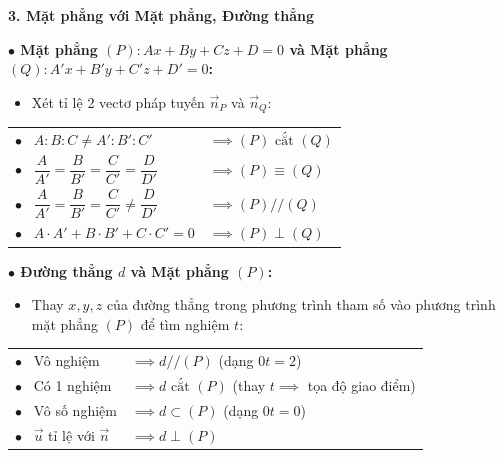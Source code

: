 \documentclass[12pt,a4paper]{article}
\begin{document}
\begin{theorybox}
    \textbf{\textcolor{deepblue}{\large 3. Mặt phẳng với Mặt phẳng, Đường thẳng}}
    \par\vspace{6pt}

    \textbf{\textcolor{amberorange}{$\bullet$ Mặt phẳng $(P)\colon Ax+By+Cz+D=0$ và Mặt phẳng $(Q)\colon A'x+B'y+C'z+D'=0$:}}
    \begin{itemize}
        \item Xét tỉ lệ 2 vectơ pháp tuyến $\vec{n}_P$ và $\vec{n}_Q$:
    \end{itemize}
    \renewcommand{\arraystretch}{1.45}
    \begin{center}
    \begin{tabular}{l @{\hskip 25pt} l}
        $\bullet$ \ $A : B : C \neq A' : B' : C'$ & $\implies (P) \text{ cắt } (Q)$ \\[6pt]
        $\bullet$ \ $\dfrac{A}{A'} = \dfrac{B}{B'} = \dfrac{C}{C'} = \dfrac{D}{D'}$ & $\implies (P) \equiv (Q)$ \\[6pt]
        $\bullet$ \ $\dfrac{A}{A'} = \dfrac{B}{B'} = \dfrac{C}{C'} \neq \dfrac{D}{D'}$ & $\implies (P) // (Q)$ \\[6pt]
        $\bullet$ \ $A \cdot A' + B \cdot B' + C \cdot C' = 0$ & $\implies (P) \perp (Q)$ \\
    \end{tabular}
    \end{center}

    \vspace{4pt}
    \textbf{\textcolor{amberorange}{$\bullet$ Đường thẳng $d$ và Mặt phẳng $(P)$:}}
    \begin{itemize}
        \item Thay $x, y, z$ của đường thẳng trong phương trình tham số vào phương trình mặt phẳng $(P)$ để tìm nghiệm $t$:
    \end{itemize}
    \renewcommand{\arraystretch}{1.4}
    \begin{center}
    \begin{tabular}{l @{\hskip 12pt} l}
        $\bullet$ \ Vô nghiệm & $\implies d // (P)$ \quad (dạng $0t = 2$) \\
        $\bullet$ \ Có 1 nghiệm & $\implies d \text{ cắt } (P)$ \quad (thay $t \implies$ tọa độ giao điểm) \\
        $\bullet$ \ Vô số nghiệm & $\implies d \subset (P)$ \quad (dạng $0t = 0$) \\
        $\bullet$ \ $\vec{u}$ tỉ lệ với $\vec{n}$ & $\implies d \perp (P)$ \\
    \end{tabular}
    \end{center}
\end{theorybox}
\end{document}
